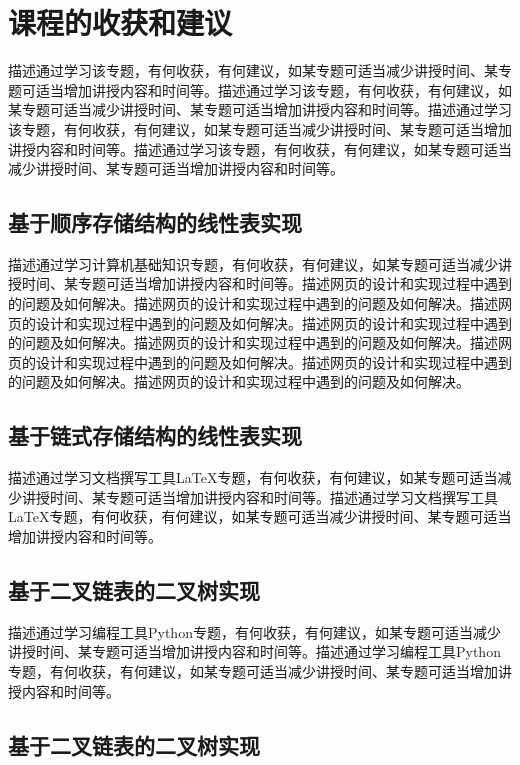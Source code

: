 \documentclass[supercite]{Experimental_Report}
\theoremstyle{definition}
\begin{document}
\section{课程的收获和建议}

描述通过学习该专题，有何收获，有何建议，如某专题可适当减少讲授时间、某专题可适当增加讲授内容和时间等。描述通过学习该专题，有何收获，有何建议，如某专题可适当减少讲授时间、某专题可适当增加讲授内容和时间等。描述通过学习该专题，有何收获，有何建议，如某专题可适当减少讲授时间、某专题可适当增加讲授内容和时间等。描述通过学习该专题，有何收获，有何建议，如某专题可适当减少讲授时间、某专题可适当增加讲授内容和时间等。

\subsection{基于顺序存储结构的线性表实现}

描述通过学习计算机基础知识专题，有何收获，有何建议，如某专题可适当减少讲授时间、某专题可适当增加讲授内容和时间等。描述网页的设计和实现过程中遇到的问题及如何解决。描述网页的设计和实现过程中遇到的问题及如何解决。描述网页的设计和实现过程中遇到的问题及如何解决。描述网页的设计和实现过程中遇到的问题及如何解决。描述网页的设计和实现过程中遇到的问题及如何解决。描述网页的设计和实现过程中遇到的问题及如何解决。描述网页的设计和实现过程中遇到的问题及如何解决。描述网页的设计和实现过程中遇到的问题及如何解决。

\subsection{基于链式存储结构的线性表实现}

描述通过学习文档撰写工具LaTeX专题，有何收获，有何建议，如某专题可适当减少讲授时间、某专题可适当增加讲授内容和时间等。描述通过学习文档撰写工具LaTeX专题，有何收获，有何建议，如某专题可适当减少讲授时间、某专题可适当增加讲授内容和时间等。

\subsection{基于二叉链表的二叉树实现}

描述通过学习编程工具Python专题，有何收获，有何建议，如某专题可适当减少讲授时间、某专题可适当增加讲授内容和时间等。描述通过学习编程工具Python专题，有何收获，有何建议，如某专题可适当减少讲授时间、某专题可适当增加讲授内容和时间等。

\subsection{基于二叉链表的二叉树实现}
\end{document}
